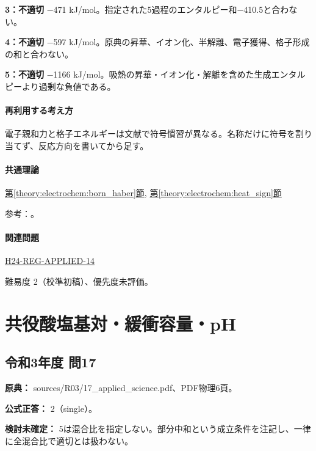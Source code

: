 \noindent\textbf{3：不適切} −471 kJ/mol。指定された5過程のエンタルピー和−410.5と合わない。\par

\noindent\textbf{4：不適切} −597 kJ/mol。原典の昇華、イオン化、半解離、電子獲得、格子形成の和と合わない。\par

\noindent\textbf{5：不適切} −1166 kJ/mol。吸熱の昇華・イオン化・解離を含めた生成エンタルピーより過剰な負値である。\par

\paragraph{再利用する考え方} 電子親和力と格子エネルギーは文献で符号慣習が異なる。名称だけに符号を割り当てず、反応方向を書いてから足す。

\paragraph{共通理論} \hyperref[theory:electrochem:born_haber]{第\ref*{theory:electrochem:born_haber}節}, \hyperref[theory:electrochem:heat_sign]{第\ref*{theory:electrochem:heat_sign}節}

\par 参考：\cite{openstax_born_haber}。

\paragraph{関連問題} \hyperref[q:h24-reg-applied-14]{H24-REG-APPLIED-14}

\par 難易度 2（校準初稿）、優先度未評価。

\section{共役酸塩基対・緩衝容量・pH}

\subsection{令和3年度 問17}
\label{q:r03-reg-applied-17}

\noindent\textbf{原典：} sources/R03/17\_applied\_science.pdf、PDF物理6頁。

\textbf{公式正答：} 2（single）。

\par\textbf{検討未確定：} 5は混合比を指定しない。部分中和という成立条件を注記し、一律に全混合比で適切とは扱わない。

